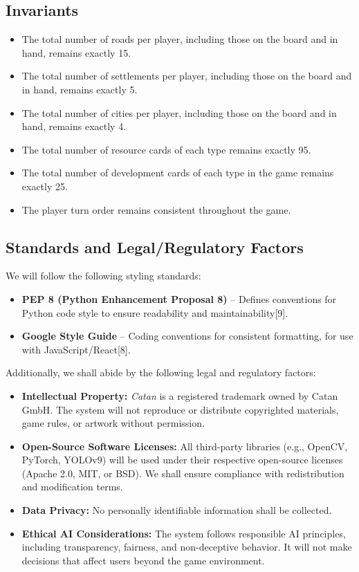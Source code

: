 \documentclass{article}
\begin{document}
\subsection{Invariants}\label{subsec:invariants}
\begin{itemize}
    \item The total number of roads per player, including those on the board and in hand, remains exactly 15.
    \item The total number of settlements per player, including those on the board and in hand, remains exactly 5.
    \item The total number of cities per player, including those on the board and in hand, remains exactly 4.
    \item The total number of resource cards of each type remains exactly 95.
    \item The total number of development cards of each type in the game remains exactly 25.
    \item The player turn order remains consistent throughout the game.
\end{itemize}


\subsection{Standards and Legal/Regulatory Factors}
We will follow the following styling standards:
\begin{itemize}
    \item \textbf{PEP 8 (Python Enhancement Proposal 8)} – Defines conventions for Python code style to ensure readability and maintainability[9].
    \item \textbf{Google Style Guide} – Coding conventions for consistent formatting, for use with JavaScript/React[8].
\end{itemize}

Additionally, we shall abide by the following legal and regulatory factors:
\begin{itemize}
    \item \textbf{Intellectual Property:}
    \emph{Catan} is a registered trademark owned by Catan GmbH. The system will not reproduce or distribute copyrighted materials, game rules, or artwork without permission.

    \item \textbf{Open-Source Software Licenses:}
    All third-party libraries (e.g., OpenCV, PyTorch, YOLOv9) will be used under their respective open-source licenses (Apache 2.0, MIT, or BSD). We shall ensure compliance with redistribution and modification terms.

    \item \textbf{Data Privacy:}
    No personally identifiable information shall be collected.

    \item \textbf{Ethical AI Considerations:}
    The system follows responsible AI principles, including transparency, fairness, and non-deceptive behavior. It will not make decisions that affect users beyond the game environment.
\end{itemize}
\end{document}
